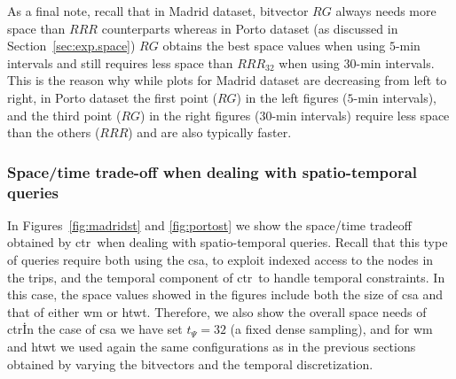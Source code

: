 

	As a final note, recall that in Madrid dataset, bitvector $RG$ always needs more space than $RRR$ counterparts 
	whereas in Porto dataset (as discussed in Section~\ref{sec:exp.space})
	$RG$ obtains the best space values when using $5$-min intervals and still requires less space than $RRR_{32}$ when using
	$30$-min intervals. 
	This is the reason why while plots for Madrid dataset are decreasing from left to right, in Porto
	dataset the first point ($RG$) in the left figures ($5$-min intervals), and the third point ($RG$) 
	in the right figures ($30$-min intervals) require less space than the others ($RRR$) and are also typically  faster. 


	\subsubsection{Space/time trade-off when dealing with spatio-temporal queries}

	In Figures~\ref{fig:madridst} and \ref{fig:portost} we show the space/time tradeoff obtained by \gls{ctr}\ when 
	dealing with spatio-temporal queries. Recall that this type of queries require both using the \gls{csa}, to 
	exploit indexed access to the nodes in the trips, and the 
	temporal component of \gls{ctr}\ to handle temporal constraints. In this case, the space values showed in
	the figures include both the size of \gls{csa} and that of either \gls{wm} or \gls{htwt}. Therefore, we also show the
	overall space needs of \gls{ctr}\. In the case of \gls{csa} we
	have set $t_{\Psi}=32$ (a fixed dense sampling), and for \gls{wm} and \gls{htwt} we used again the same 
	configurations as in the previous sections obtained by varying the bitvectors and the temporal discretization. 

